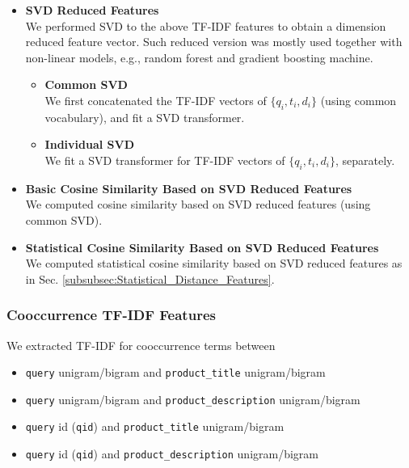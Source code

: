 \documentclass[12pt]{article}
\begin{document}
\begin{itemize}
\item \textbf{SVD Reduced Features}\\
We performed SVD to the above TF-IDF features to obtain a dimension reduced feature vector. Such reduced version was mostly used together with non-linear models, e.g., random forest and gradient boosting machine.
\begin{itemize}
\item \textbf{Common SVD}\\
We first concatenated the TF-IDF vectors of $\{q_i, t_i, d_i\}$ (using common vocabulary), and fit a SVD transformer.
\item \textbf{Individual SVD}\\
We fit a SVD transformer for TF-IDF vectors of $\{q_i, t_i, d_i\}$, separately.
\end{itemize}
\item \textbf{Basic Cosine Similarity Based on SVD Reduced Features}\\
We computed cosine similarity based on SVD reduced features (using common SVD).
\item \textbf{Statistical Cosine Similarity Based on SVD Reduced Features}\\
We computed statistical cosine similarity based on SVD reduced features as in Sec. \ref{subsubsec:Statistical_Distance_Features}.
\end{itemize}
\subsubsection{Cooccurrence TF-IDF Features}
\label{subsubsec:Cooccurrence_TFIDF_Features}
We extracted TF-IDF for cooccurrence terms between
\begin{itemize}
\item \texttt{query} unigram/bigram and \texttt{product\_title} unigram/bigram
\item \texttt{query} unigram/bigram and \texttt{product\_description} unigram/bigram
\item \texttt{query} id (\texttt{qid}) and \texttt{product\_title} unigram/bigram
\item \texttt{query} id (\texttt{qid}) and \texttt{product\_description} unigram/bigram
\end{itemize}
\end{document}
